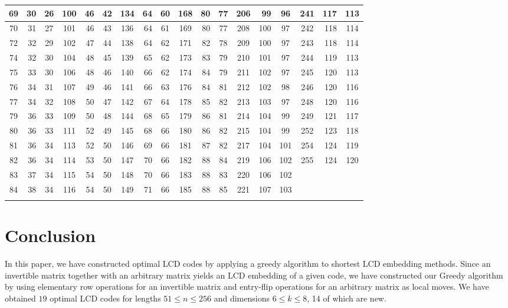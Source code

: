 \documentclass{article}
\theoremstyle{definition}
\theoremstyle{remark}
\begin{document}
\begin{table}[p]
{\begin{minipage}{0.92\textheight}
{\begin{tabular}{c|r|c||c|r|c||c|r|c||c|r|c||c|r|c||c|r|c}
\hline
69 & 30 & 26 & 100 & 46 & 42 & 134 & 64 & 60 & 168 & 80 & 77 & 206 & 99 & 96 & 241 & 117 & 113\\
\hline
70 & 31 & 27 & 101 & 46 & 43 & 136 & 64 & 61 & 169 & 80 & 77 & 208 & 100 & 97 & 242 & 118 & 114\\
\hline
72 & 32 & 29 & 102 & 47 & 44 & 138 & 64 & 62 & 171 & 82 & 78 & 209 & 100 & 97 & 243 & 118 & 114\\
\hline
74 & 32 & 30 & 104 & 48 & 45 & 139 & 65 & 62 & 173 & 83 & 79 & 210 & 101 & 97 & 244 & 119 & 113\\
\hline
75 & 33 & 30 & 106 & 48 & 46 & 140 & 66 & 62 & 174 & 84 & 79 & 211 & 102 & 97 & 245 & 120 & 113\\
\hline
76 & 34 & 31 & 107 & 49 & 46 & 141 & 66 & 63 & 176 & 84 & 81 & 212 & 102 & 98 & 246 & 120 & 116\\
\hline
77 & 34 & 32 & 108 & 50 & 47 & 142 & 67 & 64 & 178 & 85 & 82 & 213 & 103 & 97 & 248 & 120 & 116\\
\hline
79 & 36 & 33 & 109 & 50 & 48 & 144 & 68 & 65 & 179 & 86 & 81 & 214 & 104 & 99 & 249 & 121 & 117\\
\hline
80 & 36 & 33 & 111 & 52 & 49 & 145 & 68 & 66 & 180 & 86 & 82 & 215 & 104 & 99 & 252 & 123 & 118\\
\hline
81 & 36 & 34 & 113 & 52 & 50 & 146 & 69 & 66 & 181 & 87 & 82 & 217 & 104 & 101 & 254 & 124 & 119\\
\hline
82 & 36 & 34 & 114 & 53 & 50 & 147 & 70 & 66 & 182 & 88 & 84 & 219 & 106 & 102 & 255 & 124 & 120\\
\hline
83 & 37 & 34 & 115 & 54 & 50 & 148 & 70 & 66 & 183 & 88 & 83 & 220 & 106 & 102 &  &  & \\
\hline
84 & 38 & 34 & 116 & 54 & 50 & 149 & 71 & 66 & 185 & 88 & 85 & 221 & 107 & 103 &  &  & \\
\Xhline{2\arrayrulewidth}
\end{tabular}%
}
\end{minipage}%
}
\end{table}

\section{Conclusion}
In this paper, we have constructed optimal LCD codes by applying a greedy algorithm to shortest LCD embedding methods. Since an invertible matrix together with an arbitrary matrix yields an LCD embedding of a given code, we have constructed our Greedy algorithm by using elementary row operations for an invertible matrix and entry-flip operations for an arbitrary matrix as local moves. We have obtained $19$ optimal LCD codes for lengths $51\le n\le 256$ and dimensions $6\le k\le 8$, 14 of which are new.
\end{document}
